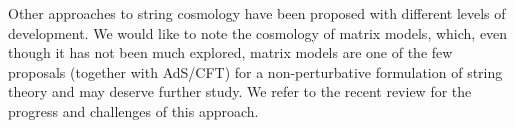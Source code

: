 Other approaches to string cosmology have been proposed with different levels of development. We would like to note the cosmology of matrix models, which, even though it has not been much explored, matrix models \cite{Banks:1996vh,Ishibashi:1996xs} are one of the few proposals (together with AdS/CFT)  for a non-perturbative formulation of string theory and may deserve further study. We refer to the recent review \cite{Brahma:2022ikl} for the progress and challenges of this approach. 

 \newpage



